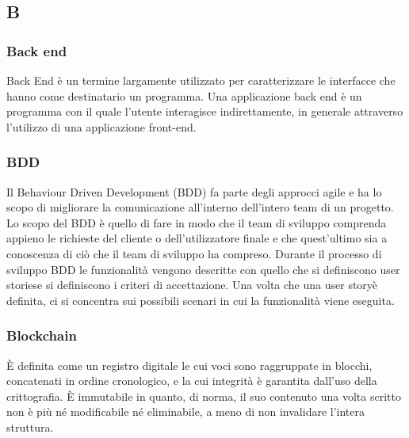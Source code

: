 \subsection*{\textbf{\hfill \Huge{B} \hfill}} 

\subsubsection*{Back end}
Back End è un termine largamente utilizzato per caratterizzare le interfacce che hanno come destinatario un programma. Una applicazione back end è un programma con il quale l'utente interagisce indirettamente, in generale attraverso l'utilizzo di una applicazione front-end.

\subsubsection*{BDD}
Il Behaviour Driven Development (BDD) fa parte degli approcci agile e ha lo scopo di migliorare la comunicazione all’interno dell’intero team di un progetto. Lo scopo del BDD è quello di fare in modo che il team di sviluppo comprenda appieno le richieste del cliente o dell’utilizzatore finale e che quest’ultimo sia a conoscenza di ciò che il team di sviluppo ha compreso. Durante il processo di sviluppo BDD le funzionalità vengono descritte con quello che si definiscono user stories\glo e si definiscono i criteri di accettazione\glo. Una volta che una user story\glo è definita, ci si concentra sui possibili scenari in cui la funzionalità viene eseguita.

\subsubsection*{Blockchain}
È definita come un registro digitale le cui voci sono raggruppate in blocchi, concatenati in ordine cronologico, e la cui integrità è garantita dall'uso della crittografia. È immutabile in quanto, di norma, il suo contenuto una volta scritto non è più né modificabile né eliminabile, a meno di non invalidare l'intera struttura.